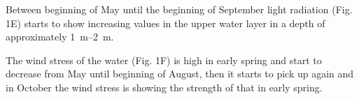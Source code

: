 \documentclass[../Main.tex]{subfiles}
\begin{document}
Between beginning of May until the beginning of September light radiation (Fig. 1E) starts to show increasing values in the upper water layer in a depth of approximately \SIrange{1}{2}{\metre}.

The wind stress of the water (Fig. 1F) is high in early spring and start to decrease from May until beginning of August, then it starts to pick up again and in October the wind stress is showing the strength of that in early spring. 
\end{document}
